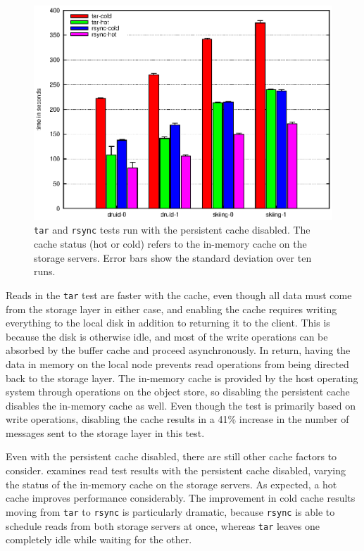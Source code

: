 \begin{figure}[t]
\centering
\includegraphics[width=\figwidth]{figures/envoy-nocache}
\caption[Cold and hot storage servers with no persistent cache]{\texttt{tar} and \texttt{rsync} tests run with the persistent cache disabled. The cache status (hot or cold) refers to the in-memory cache on the storage servers. Error bars show the standard deviation over ten runs.}
\label{fig:envoy-nocache}
\end{figure}

Reads in the \texttt{tar} test are faster with the cache, even though all data must come from the storage layer in either case, and enabling the cache requires writing everything to the local disk in addition to returning it to the client. This is because the disk is otherwise idle, and most of the write operations can be absorbed by the buffer cache and proceed asynchronously. In return, having the data in memory on the local node prevents read operations from being directed back to the storage layer. The in-memory cache is provided by the host operating system through operations on the object store, so disabling the persistent cache disables the in-memory cache as well. Even though the test is primarily based on write operations, disabling the cache results in a 41\% increase in the number of messages sent to the storage layer in this test.

Even with the persistent cache disabled, there are still other cache factors to consider.  examines read test results with the persistent cache disabled, varying the status of the in-memory cache on the storage servers. As expected, a hot cache improves performance considerably. The improvement in cold cache results moving from \texttt{tar} to \texttt{rsync} is particularly dramatic, because \texttt{rsync} is able to schedule reads from both storage servers at once, whereas \texttt{tar} leaves one completely idle while waiting for the other.

